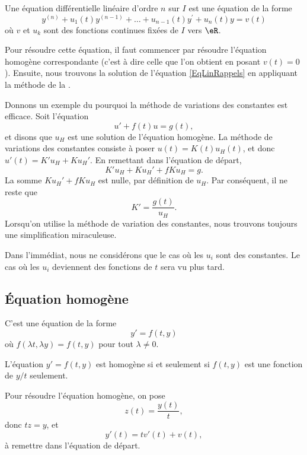 Une équation différentielle linéaire d'ordre $n$ sur $I$ est une
équation de la forme
\begin{equation}	\label{EqLinRappels}
	y^{(n)} + u_1(t) y^{(n-1)} + \ldots + u_{n-1}(t) y^\prime + u_n(t) y = v(t)
\end{equation}
où $v$ et $u_k$ sont des fonctions continues fixées de $I$ vers $\eR$.

Pour résoudre cette équation, il faut commencer par résoudre l'équation homogène correspondante (c'est à dire celle que l'on obtient en posant $v(t)=0$). Ensuite, nous trouvons la solution de l'équation \eqref{EqLinRappels} en appliquant la méthode de la .

Donnons un exemple du pourquoi la méthode de variations des constantes est efficace. Soit l'équation 
\begin{equation}		\label{EqDiffExempleVarCst}
	u'+f(t)u=g(t),
\end{equation}
 et disons que $u_H$ est une solution de l'équation homogène. La méthode de variations des constantes consiste à poser $u(t)=K(t)u_H(t)$, et donc $u'(t)=K'u_H+Ku_H'$. En remettant dans l'équation de départ,
\begin{equation}
	K'u_H+Ku_H'+fKu_H=g.
\end{equation}
La somme $Ku_H'+fKu_H$ est nulle, par définition de $u_H$. Par conséquent, il ne reste que
\begin{equation}
	K'=\frac{ g(t) }{ u_H }.
\end{equation}
Lorsqu'on utilise la méthode de variation des constantes, nous trouvons toujours une simplification \og miraculeuse\fg.

Dans l'immédiat, nous ne considérons que le cas où les \( u_i\) sont des constantes. Le cas où les \( u_i\) deviennent des fonctions de \( t\) sera vu plus tard.


					\subsection{Équation homogène}
\label{SubSecEqDiffHomo}

C'est une équation de la forme
\begin{equation}
	y'=f(t,y)
\end{equation}
où $f(\lambda t,\lambda y)=f(t,y)$ pour tout $\lambda\neq 0$.
\begin{lemma}
L'équation $y'=f(t,y)$ est homogène si et seulement si $f(t,y)$ est une fonction de $y/t$ seulement.
\end{lemma}
Pour résoudre l'équation homogène, on pose
\begin{equation}		\label{EqDiffHomoPoser}
	z(t)=\frac{ y(t) }{ t },
\end{equation}
donc $tz=y$, et 
\begin{equation}
	y'(t)=tv'(t)+v(t),
\end{equation}
à remettre dans l'équation de départ.

